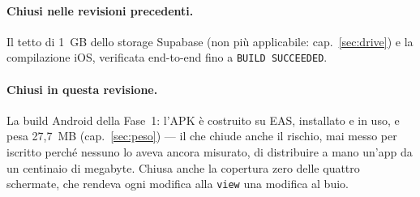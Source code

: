 \documentclass[11pt,a4paper]{report}
\begin{document}
\paragraph{Chiusi nelle revisioni precedenti.} Il tetto di 1~GB dello storage
Supabase (non pi\`u applicabile: cap.~\ref{sec:drive}) e la compilazione iOS,
verificata end-to-end fino a \texttt{BUILD SUCCEEDED}.

\paragraph{Chiusi in questa revisione.} La build Android della Fase~1: l'APK
\`e costruito su EAS, installato e in uso, e pesa 27,7~MB
(cap.~\ref{sec:peso}) --- il che chiude anche il rischio, mai messo per
iscritto perch\'e nessuno lo aveva ancora misurato, di distribuire a mano
un'app da un centinaio di megabyte. Chiusa anche la copertura zero delle
quattro schermate, che rendeva ogni modifica alla \texttt{view} una modifica al
buio.
\end{document}

